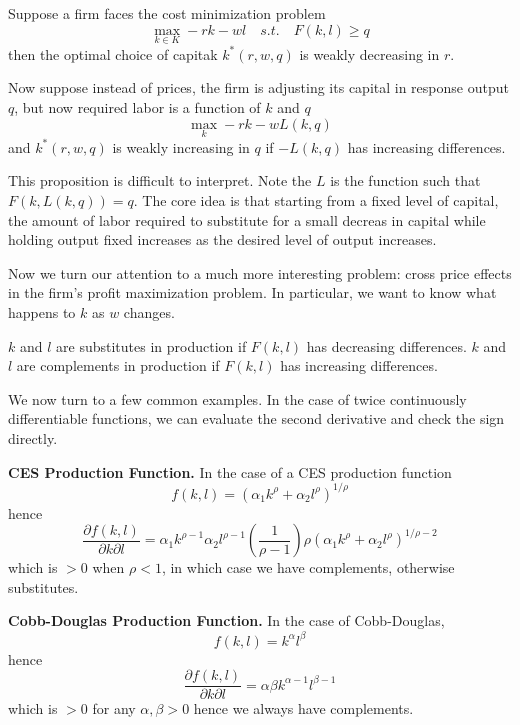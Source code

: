 \begin{prop}
  Suppose a firm faces the cost minimization problem
  \[
  \max_{k \in K} -rk - wl \quad s.t. \quad F(k,l) \geq q
  \]
  then the optimal choice of capitak $k^*(r,w,q)$ is weakly decreasing
  in $r$.
\end{prop}

\begin{prop}
  Now suppose instead of prices, the firm is adjusting its capital in
  response output $q$, but now required labor is a function of $k$ and
  $q$
  \[
  \max_k -rk - wL(k,q)
  \]
  and $k^*(r,w,q)$ is weakly increasing in $q$ if $-L(k,q)$ has
  increasing differences.
\end{prop}

This proposition is difficult to interpret. Note the $L$ is the
function such that $F(k, L(k,q)) = q$. The core idea is that starting
from a fixed level of capital, the amount of labor required to
substitute for a small decreas in capital while holding output fixed
increases as the desired level of output increases.

Now we turn our attention to a much more interesting problem: cross
price effects in the firm's profit maximization problem. In
particular, we want to know what happens to $k$ as $w$ changes.

\begin{definition}
  $k$ and $l$ are substitutes in production if $F(k,l)$ has decreasing
  differences. $k$ and $l$ are complements in production if $F(k,l)$
  has increasing differences.
\end{definition}

We now turn to a few common examples. In the case of twice
continuously differentiable functions, we can evaluate the second
derivative and check the sign directly.

\textbf{CES Production Function.} In the case of a CES production function
\[
f(k,l) = (\alpha_1 k^\rho + \alpha_2 l^\rho)^{1/\rho}
\]
hence
\[
\frac{\partial f(k,l)}{\partial k \partial l}
= \alpha_1k^{\rho-1}\alpha_2l^{\rho-1}(\frac{1}{\rho-1})
\rho(\alpha_1k^\rho + \alpha_2l^\rho)^{1/\rho-2}
\]
which is $>0$ when $\rho < 1$, in which case we have complements,
otherwise substitutes.

\textbf{Cobb-Douglas Production Function.} In the case of Cobb-Douglas,
\[
f(k,l) = k^\alpha l^\beta
\]
hence
\[
\frac{\partial f(k,l)}{\partial k \partial l}
= \alpha \beta k^{\alpha-1} l^{\beta-1}
\]
which is $> 0 $ for any $\alpha, \beta > 0$ hence we always have
complements.

